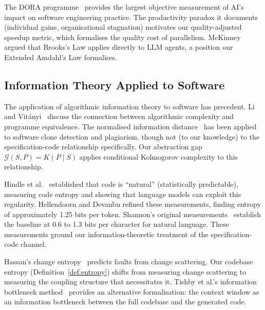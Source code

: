 \documentclass[11pt, a4paper, logo, copyright]{googledeepmind}
\begin{document}
The DORA programme~\citep{dora2025} provides the largest objective measurement of AI's impact on software engineering practice. The productivity paradox it documents (individual gains, organisational stagnation) motivates our quality-adjusted speedup metric, which formalises the quality cost of parallelism. McKinney~\citep{McKinney2026} argued that Brooks's Law applies directly to LLM agents, a position our Extended Amdahl's Law formalises.


\subsection{Information Theory Applied to Software}

The application of algorithmic information theory to software has precedent. Li and Vit\'{a}nyi~\citep{li2019introduction} discuss the connection between algorithmic complexity and programme equivalence. The normalised information distance~\citep{li2004similarity} has been applied to software clone detection and plagiarism, though not (to our knowledge) to the specification-code relationship specifically. Our abstraction gap $\mathcal{G}(S, P) = K(P \mid S)$ applies conditional Kolmogorov complexity to this relationship.

Hindle et al.~\citep{hindle2012naturalness} established that code is ``natural'' (statistically predictable), measuring code entropy and showing that language models can exploit this regularity. Hellendoorn and Devanbu refined these measurements, finding entropy of approximately 1.25 bits per token. Shannon's original measurements~\citep{shannon1948} establish the baseline at 0.6 to 1.3 bits per character for natural language. These measurements ground our information-theoretic treatment of the specification-code channel.

Hassan's change entropy~\citep{hassan2009} predicts faults from change scattering. Our codebase entropy (Definition~\ref{def:entropy}) shifts from measuring change scattering to measuring the coupling structure that necessitates it. Tishby et al.'s information bottleneck method~\citep{tishby2000information} provides an alternative formalisation: the context window as an information bottleneck between the full codebase and the generated code.
\end{document}
